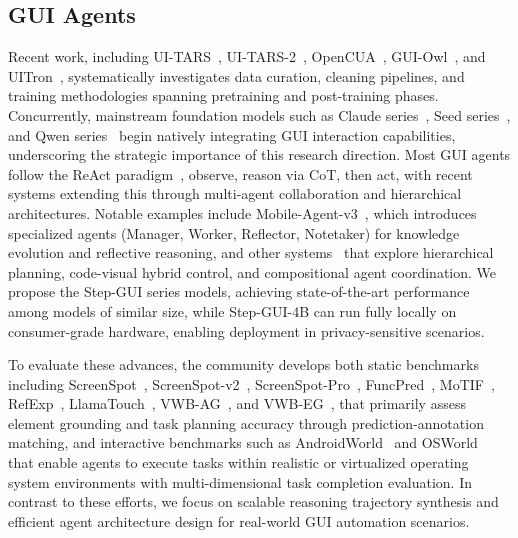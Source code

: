 \subsection{GUI Agents}

Recent work, including UI-TARS~\cite{qin2025ui_uitars1}, UI-TARS-2~\cite{wang2025ui_uitars2}, OpenCUA~\cite{wang2025opencua}, GUI-Owl~\cite{ye2025mobile_mobileagentv3}, and UITron~\cite{zeng2025uitron}, systematically investigates data curation, cleaning pipelines, and training methodologies spanning pretraining and post-training phases. Concurrently, mainstream foundation models such as Claude series~\cite{claudeopus45}, Seed series~\cite{guo2025seed1}, and Qwen series~\cite{yang2025qwen3} begin natively integrating GUI interaction capabilities, underscoring the strategic importance of this research direction. Most GUI agents follow the ReAct paradigm~\cite{yao2022react}, observe, reason via CoT, then act, with recent systems extending this through multi-agent collaboration and hierarchical architectures. Notable examples include Mobile-Agent-v3~\cite{ye2025mobile_mobileagentv3}, which introduces specialized agents (Manager, Worker, Reflector, Notetaker) for knowledge evolution and reflective reasoning, and other systems~\cite{liu2025pc,song2025coact1,zhang2025ufo2,agashe2025agents2} that explore hierarchical planning, code-visual hybrid control, and compositional agent coordination. We propose the Step-GUI series models, achieving state-of-the-art performance among models of similar size, while Step-GUI-4B can run fully locally on consumer-grade hardware, enabling deployment in privacy-sensitive scenarios. 

To evaluate these advances, the community develops both static benchmarks including ScreenSpot~\cite{cheng2024seeclick}, ScreenSpot-v2~\cite{wu2024atlas}, ScreenSpot-Pro~\cite{li2025screenspotpro}, FuncPred~\cite{li2025autogui}, MoTIF~\cite{burns2022dataset_motif}, RefExp~\cite{rastogi2021uibert_refexp}, LlamaTouch~\cite{zhang2024llamatouch}, VWB-AG~\cite{liu2024visualwebbench_vwb}, and VWB-EG~\cite{liu2024visualwebbench_vwb}, that primarily assess element grounding and task planning accuracy through prediction-annotation matching, and interactive benchmarks such as AndroidWorld~\cite{rawles2024androidworld} and OSWorld~\cite{xie2024osworld} that enable agents to execute tasks within realistic or virtualized operating system environments with multi-dimensional task completion evaluation. In contrast to these efforts, we focus on scalable reasoning trajectory synthesis and efficient agent architecture design for real-world GUI automation scenarios.